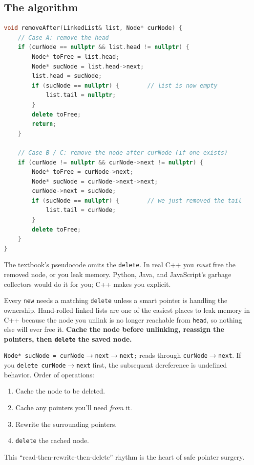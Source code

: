 \documentclass[11pt]{article}
\begin{document}
\subsection{The algorithm}

\begin{examplebox}
\begin{lstlisting}[basicstyle=\ttfamily\small,frame=single,language=C++]
void removeAfter(LinkedList& list, Node* curNode) {
    // Case A: remove the head
    if (curNode == nullptr && list.head != nullptr) {
        Node* toFree = list.head;
        Node* sucNode = list.head->next;
        list.head = sucNode;
        if (sucNode == nullptr) {        // list is now empty
            list.tail = nullptr;
        }
        delete toFree;
        return;
    }

    // Case B / C: remove the node after curNode (if one exists)
    if (curNode != nullptr && curNode->next != nullptr) {
        Node* toFree = curNode->next;
        Node* sucNode = curNode->next->next;
        curNode->next = sucNode;
        if (sucNode == nullptr) {        // we just removed the tail
            list.tail = curNode;
        }
        delete toFree;
    }
}
\end{lstlisting}
The textbook's pseudocode omits the \texttt{delete}. In real C++
you \emph{must} free the removed node, or you leak memory. Python,
Java, and JavaScript's garbage collectors would do it for you;
C++ makes you explicit.
\end{examplebox}

\begin{warnbox}
Every \texttt{new} needs a matching \texttt{delete} unless a smart
pointer is handling the ownership. Hand-rolled linked lists are one
of the easiest places to leak memory in C++ because the node you
unlink is no longer reachable from \texttt{head}, so nothing else
will ever free it. \textbf{Cache the node before unlinking,
reassign the pointers, then \texttt{delete} the saved node.}
\end{warnbox}

\begin{warnbox}
\texttt{Node* sucNode = curNode$\to$next$\to$next;} reads through
\texttt{curNode$\to$next}. If you \texttt{delete curNode$\to$next}
first, the subsequent dereference is undefined behavior. Order of
operations:
\begin{enumerate}[leftmargin=*]
  \item Cache the node to be deleted.
  \item Cache any pointers you'll need \emph{from} it.
  \item Rewrite the surrounding pointers.
  \item \texttt{delete} the cached node.
\end{enumerate}
This ``read-then-rewrite-then-delete'' rhythm is the heart of
safe pointer surgery.
\end{warnbox}
\end{document}
